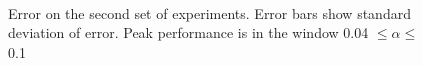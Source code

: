 \documentclass[a4paper,11pt]{article}
\begin{document}
    \begin{figure}
    \\
    \caption{Error on the second set of experiments. Error bars show
    standard deviation of error. Peak performance is in the window 0.04
    $\leq\alpha\leq$ 0.1}
    \label{fig:fineerror}
    \end{figure}
\end{document}
